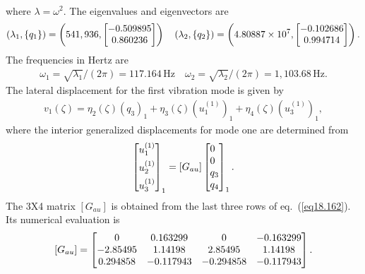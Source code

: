 \documentclass{AeroStructure-ERJohnson}
\begin{document}
\begin{example}
\begin{align}
\end{align}
where $\lambda=\omega^{2}$. The eigenvalues and eigenvectors are
\begin{align}\label{ex18.4f}
\left(\lambda_{1},\left\{q_{1}\right\}\right)=\left(541,936,\left[\begin{array}{@{}c@{}}-0.509895 \\0.860236\end{array}\right]\right) \quad\left(\lambda_{2},\left\{q_{2}\right\}\right)=\left(4.80887 \times 10^{7},\left[\begin{array}{@{}c@{}}-0.102686 \\0.994714\end{array}\right]\right).
\end{align}
The frequencies in Hertz are
\begin{align}\label{ex18.4g}
\omega_{1}=\sqrt{\lambda_{1}} /(2 \pi)=117.164\,\mathrm{Hz} \quad \omega_{2}=\sqrt{\lambda_{2}} /(2 \pi)=1,103.68\,\mathrm{Hz}.
\end{align}
The lateral displacement for the first vibration mode is given by
\begin{align}\label{ex18.4h}
v_{1}(\zeta)=\eta_{2}(\zeta)\left(q_{3}\right)_{1}+\eta_{3}(\zeta)\left(u_{1}^{(1)}\right)_{1}+\eta_{4}(\zeta)\left(u_{3}^{(1)}\right)_{1},
\end{align}
where the interior generalized displacements for mode one are determined from
\begin{align}\label{ex18.4i}
\left[\begin{array}{@{}l@{}}u_{1}^{(1)} \\[4pt] u_{2}^{(1)} \\[4pt] u_{3}^{(1)}\end{array}\right]_{1}=\left[G_{a u}\right]\left[\begin{array}{@{}l@{}}0 \\0 \\q_{3} \\q_{4}\end{array}\right]_{1}.
\end{align}
The 3X4 matrix $\left[G_{a u}\right]$ is obtained from the last three rows of eq.~(\ref{eq18.162}). Its numerical evaluation is
\begin{align}\label{ex18.4j}
\left[G_{a u}\right]=\left[\begin{array}{@{}cccc@{}}0 & 0.163299 & 0 & -0.163299 \\-2.85495 & 1.14198 & 2.85495 & 1.14198 \\0.294858 & -0.117943 & -0.294858 & -0.117943\end{array}\right].

\end{align}
\end{example}
\end{document}
